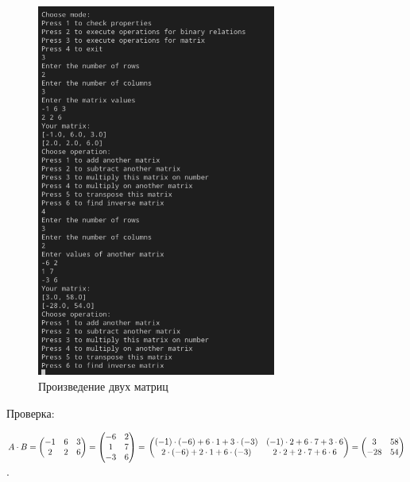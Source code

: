 \documentclass[bachelor, och, labwork]{shiza}
\begin{document}
        \begin{figure}[H]
            \centering
            \includegraphics[width=0.7\textwidth]{photo/6.png}
            \caption{Произведение двух матриц}
        \end{figure}
        
        Проверка:

        $A \cdot B =
        \begin{pmatrix}
            -1 & 6 & 3  \\
            2 & 2 & 6
        \end{pmatrix} =
        \begin{pmatrix}
            -6 & 2 \\
            1 & 7 \\
            -3 & 6
        \end{pmatrix} = \\
        \begin{pmatrix}
            (-1) \cdot (-6) + 6 \cdot 1 + 3 \cdot (-3) & (-1) \cdot 2 + 6 \cdot 7 + 3 \cdot 6 \\
            2 \cdot (-6) + 2 \cdot 1 + 6 \cdot (-3)  & 2 \cdot 2 + 2 \cdot 7 + 6 \cdot 6
        \end{pmatrix} = 
        \begin{pmatrix}
            3 & 58 \\
            -28 & 54
        \end{pmatrix}$.\\
\end{document}
